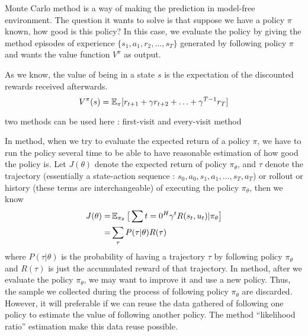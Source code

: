 \documentclass[9pt]{article}
\begin{document}
 Monte Carlo method is a way of making the prediction in model-free environment. The question it wants to solve is that suppose we have a policy $\pi$ known, how good is this policy? In this case, we evaluate the policy by giving the method episodes of experience $\{s_1,a_1,r_2,\ldots,s_T\}$ generated by following policy $\pi$ and wants the value function $V^{\pi}$ as output.

As we know, the value of being in a state $s$ is the expectation of the discounted rewards received afterwards. 
\[
V^{\pi}(s) = \operatorname{\mathbb{E}}_{\pi}[r_{t+1} + \gamma r_{t+2} + \ldots + \gamma^{T-1}r_T]
\]

two methods can be used here : first-visit and every-visit method

 In  method, when we try to evaluate the expected return of a policy $\pi$, we have to run the policy several time to be able to have reasonable estimation of how good the policy is. Let $J(\theta)$ denote the expected return of policy $\pi_{\theta}$, and $\tau$ denote the trajectory (essentially a state-action sequence : $s_0, a_0, s_1, a_1, \ldots, s_T, a_T$) or rollout or history (these terms are interchangeable) of executing the policy $\pi_{\theta}$, then we know
\[
\begin{split}
J(\theta) = & \operatorname{\mathbb{E}}_{\pi_{\theta}}\big[\sum{t=0}^{H}\gamma^tR(s_t,u_t)|\pi_{\theta}\big]\\
= & \sum_{\tau}P(\tau|\theta)R(\tau)
\end{split}
\]
where $P(\tau|\theta)$ is the probability of having a trajectory $\tau$ by following policy $\pi_{\theta}$ and $R(\tau)$ is just the accumulated reward of that trajectory. 
In  method, after we evaluate the policy $\pi_{\theta}$, we may want to improve it and use a new policy. Thus, the sample we collected during the process of following policy $\pi_{\theta}$ are discarded. However, it will preferable if we can reuse the data gathered of following one policy to estimate the value of following another policy. The method ``likelihood ratio'' estimation make this data reuse possible.
\end{document}
